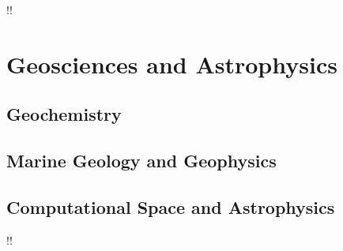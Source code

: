 \documentclass[11pt,a4paper,twoside,twocolumn]{article}
\makeatletter
\renewcommand*{\cleardoublepage}{\clearpage\if@twoside \ifodd\c@page\else
    \hbox{}
    \if!\blankpagetext!\else
    \vfil \begin{center} \setlength{\fboxsep}{3mm}%
    \framebox{\blankpagetext}
    \end{center}\vfil\vfil \fi
    \newpage\if@twocolumn\hbox{}\newpage\fi\fi\fi}
\makeatother
\begin{document}
\begin{bibunit}[hplain]

\putbib[combined]
\end{bibunit}

\begin{bibunit}[hplain]

\putbib[combined]
\end{bibunit}

\begin{bibunit}[hplain]

\putbib[combined]
\end{bibunit}

%


\cleardoublepage
{}
\section{Geosciences and Astrophysics}

\subsection{Geochemistry}
\begin{bibunit}[hplain]

\putbib[combined]
\end{bibunit}
\begin{bibunit}[hplain]

\putbib[combined]
\end{bibunit}
\subsection{Marine Geology and Geophysics}
\begin{bibunit}[hplain]

\putbib[combined]
\end{bibunit}
\begin{bibunit}[hplain]

\putbib[combined]
\end{bibunit}
\begin{bibunit}[hplain]

\putbib[combined]
\end{bibunit}
\subsection{Computational Space and Astrophysics}
\begin{bibunit}[hplain]

\putbib[combined]
\end{bibunit}
\begin{bibunit}[hplain]

\putbib[combined]
\end{bibunit}
\begin{bibunit}[hplain]

\putbib[combined]
\end{bibunit}
\cleardoublepage
\end{document}
